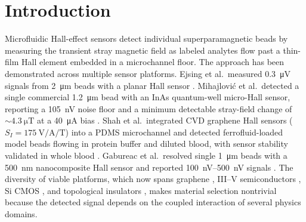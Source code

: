 \documentclass[biosensors,article,submit,pdftex,moreauthors]{Definitions/mdpi}
\begin{document}
\section{Introduction}
\label{sec:intro}

Microfluidic Hall-effect sensors detect individual superparamagnetic beads by
measuring the transient stray magnetic field as labeled analytes flow past a
thin-film Hall element embedded in a microchannel floor. The approach has been
demonstrated across multiple sensor platforms. Ejsing et al.\ measured
\SI{0.3}{\micro\volt} signals from \SI{2}{\micro\meter} beads with a planar Hall
sensor \cite{ejsing2004}. Mihajlovi\'{c} et al.\ detected a single commercial
\SI{1.2}{\micro\meter} bead with an InAs quantum-well micro-Hall sensor, reporting
a \SI{105}{\nano\volt} noise floor and a minimum detectable stray-field change of
${\sim}\SI{4.3}{\micro\tesla}$ at a \SI{40}{\micro\ampere} bias \cite{mihajlovic2005}.
Shah et al.\ integrated CVD graphene Hall sensors
($S_I = \SI{175}{\volt\per\ampere\per\tesla}$) into a PDMS microchannel and
detected ferrofluid-loaded model beads flowing in protein buffer and diluted
blood, with sensor stability validated in whole blood \cite{shah2023}. Gabureac et al.\ resolved single
\SI{1}{\micro\meter} beads with a \SI{500}{\nano\meter} nanocomposite Hall sensor
and reported \SIrange{100}{500}{\nano\volt} signals \cite{gabureac2013}. The
diversity of viable platforms, which now spans graphene
\cite{dauber2015,kaidarova2021}, III--V semiconductors
\cite{mihajlovic2005,gilbertson2011}, Si CMOS \cite{besse2002}, and topological
insulators \cite{saeed2024}, makes material selection nontrivial because the
detected signal depends on the coupled interaction of several physics domains.
\end{document}
